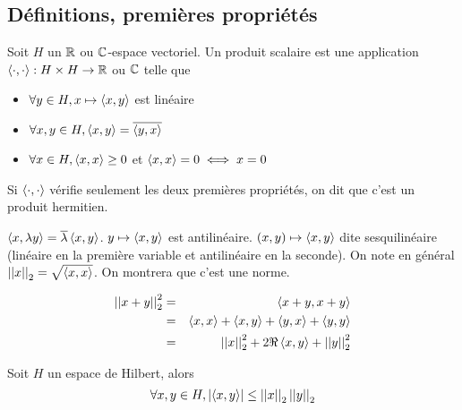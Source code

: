 \subsection{Définitions, premières propriétés}

\begin{definition}
	Soit $H$ un $\mathbb{R}$ ou $\mathbb{C}$-espace vectoriel.
	Un produit scalaire est une application $\left\langle \cdot, \cdot \right\rangle : H \times H \to \mathbb{R}$ ou $\mathbb{C}$ telle que
	\begin{itemize}
		\item $\forall y \in H, x \mapsto \left\langle x, y \right\rangle$ est linéaire
		\item $\forall x,y \in H, \left\langle x, y \right\rangle = \overline{\left\langle y, x \right\rangle}$
		\item $\forall x \in H, \left\langle x, x \right\rangle \geq 0$ et $\left\langle x, x \right\rangle = 0 \iff x = 0$
	\end{itemize}

	Si $\left\langle \cdot, \cdot \right\rangle$ vérifie seulement les deux premières propriétés, on dit que c'est un produit hermitien.
\end{definition}

\begin{remarque}
	$\left\langle x, \lambda y \right\rangle = \overline{\lambda} \left\langle x, y \right\rangle $.
	$y \mapsto \left\langle x, y \right\rangle$ est antilinéaire.
	$(x,y) \mapsto \left\langle x, y \right\rangle$ dite sesquilinéaire (linéaire en la première variable et antilinéaire en la seconde).
	On note en général $\left|\left|x\right|\right|_2 = \sqrt{\left\langle x, x \right\rangle}$. On montrera que c'est une norme.
\end{remarque}

\begin{remarque}
	\begin{eqnarray*}
		\left|\left|x + y\right|\right|_2^2 &=& \left\langle x + y, x + y \right\rangle\\
		&=& \left\langle x, x \right\rangle + \left\langle x, y \right\rangle + \left\langle y, x \right\rangle + \left\langle y, y \right\rangle\\
		&=& \left|\left|x\right|\right|_2^2 + 2\Re \left\langle x, y \right\rangle + \left|\left|y\right|\right|_2^2
	\end{eqnarray*}
\end{remarque}

\begin{prop}
	Soit $H$ un espace de Hilbert, alors
	$$ \forall x,y \in H, \left|\left\langle x, y \right\rangle\right| \leq \left|\left|x\right|\right|_2 \left|\left|y\right|\right|_2 $$
\end{prop}


